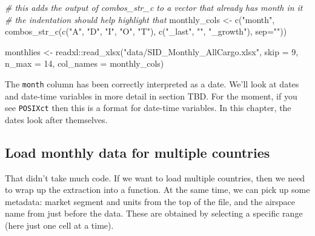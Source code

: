 \documentclass[
]{book}
\newenvironment{Shaded}{\begin{snugshade}}{\end{snugshade}}
\newcommand{\AttributeTok}[1]{\textcolor[rgb]{0.77,0.63,0.00}{#1}}
\newcommand{\CommentTok}[1]{\textcolor[rgb]{0.56,0.35,0.01}{\textit{#1}}}
\newcommand{\DecValTok}[1]{\textcolor[rgb]{0.00,0.00,0.81}{#1}}
\newcommand{\FunctionTok}[1]{\textcolor[rgb]{0.00,0.00,0.00}{#1}}
\newcommand{\NormalTok}[1]{#1}
\newcommand{\OtherTok}[1]{\textcolor[rgb]{0.56,0.35,0.01}{#1}}
\newcommand{\SpecialCharTok}[1]{\textcolor[rgb]{0.00,0.00,0.00}{#1}}
\newcommand{\StringTok}[1]{\textcolor[rgb]{0.31,0.60,0.02}{#1}}
\begin{document}
\begin{Shaded}
\begin{Highlighting}[]
\CommentTok{\# this adds the output of combos\_str\_c to a vector that already has \textquotesingle{}month\textquotesingle{} in it}
\CommentTok{\# the indentation should help highlight that}
\NormalTok{monthly\_cols }\OtherTok{\textless{}{-}} \FunctionTok{c}\NormalTok{(}\StringTok{"month"}\NormalTok{, }
                  \FunctionTok{combos\_str\_c}\NormalTok{(}\FunctionTok{c}\NormalTok{(}\StringTok{"A"}\NormalTok{, }\StringTok{"D"}\NormalTok{, }\StringTok{"I"}\NormalTok{, }\StringTok{"O"}\NormalTok{, }\StringTok{"T"}\NormalTok{), }
                               \FunctionTok{c}\NormalTok{(}\StringTok{"\_last"}\NormalTok{, }\StringTok{""}\NormalTok{, }\StringTok{"\_growth"}\NormalTok{),}
                               \AttributeTok{sep=}\StringTok{""}\NormalTok{))}

\NormalTok{monthlies }\OtherTok{\textless{}{-}}\NormalTok{ readxl}\SpecialCharTok{::}\FunctionTok{read\_xlsx}\NormalTok{(}\StringTok{"data/SID\_Monthly\_AllCargo.xlsx"}\NormalTok{, }\AttributeTok{skip =} \DecValTok{9}\NormalTok{, }\AttributeTok{n\_max =} \DecValTok{14}\NormalTok{, }
                               \AttributeTok{col\_names =}\NormalTok{ monthly\_cols) }
\end{Highlighting}
\end{Shaded}

The \texttt{month} column has been correctly interpreted as a date. We'll look at dates and date-time variables in more detail in section TBD. For the moment, if you see \texttt{POSIXct} then this is a format for date-time variables. In this chapter, the dates look after themselves.

\hypertarget{loadmultiplemonthlies}{%
\subsection{Load monthly data for multiple countries}\label{loadmultiplemonthlies}}

That didn't take much code. If we want to load multiple countries, then we need to wrap up the extraction into a function. At the same time, we can pick up some metadata: market segment and units from the top of the file, and the airspace name from just before the data. These are obtained by selecting a specific range (here just one cell at a time).
\end{document}
